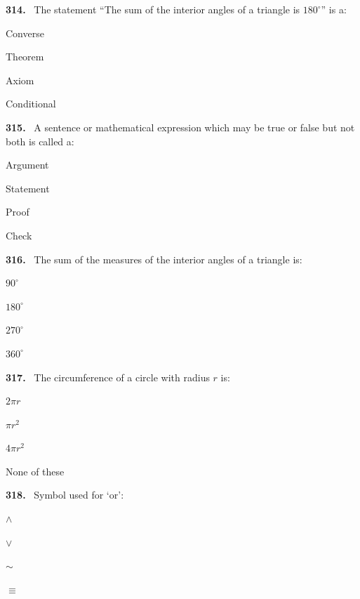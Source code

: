 \documentclass[11pt]{article}
\newenvironment{qenv}[1]{%
  \par\medskip\noindent\textbf{#1.}\ \ignorespaces
}{\par}
\begin{document}
\begin{qenv}{314} The statement ``The sum of the interior angles of a triangle is $180^{\circ}$'' is a:
\begin{options} \item Converse \item Theorem \item Axiom \item Conditional \end{options} \end{qenv}

\begin{qenv}{315} A sentence or mathematical expression which may be true or false but not both is called a:
\begin{options} \item Argument \item Statement \item Proof \item Check \end{options} \end{qenv}

\begin{qenv}{316} The sum of the measures of the interior angles of a triangle is:
\begin{options} \item $90^{\circ}$ \item $180^{\circ}$ \item $270^{\circ}$ \item $360^{\circ}$ \end{options} \end{qenv}

\begin{qenv}{317} The circumference of a circle with radius $r$ is:
\begin{options} \item $2\pi r$ \item $\pi r^2$ \item $4\pi r^2$ \item None of these \end{options} \end{qenv}

\begin{qenv}{318} Symbol used for `or':
\begin{options} \item $\wedge$ \item $\vee$ \item $\sim$ \item $\equiv$ \end{options} \end{qenv}
\end{document}
